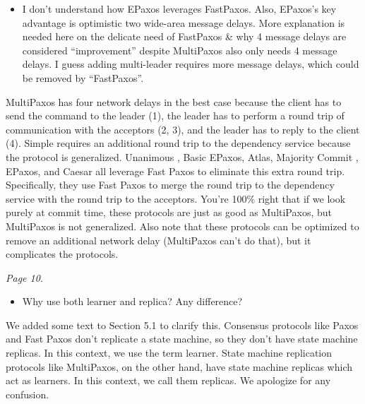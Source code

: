 \documentclass[letterpaper,twocolumn,10pt]{article}
\newenvironment{reviewerquote}
{\list{}{\leftmargin=\parindent\rightmargin=0in}\item[] \itshape \color{ReviewerDarkGray}}%
{\endlist}
\begin{document}
\begin{reviewerquote}
  \begin{itemize}
    \item
      I don't understand how EPaxos leverages FastPaxos. Also, EPaxos's key
      advantage is optimistic two wide-area message delays. More explanation is
      needed here on the delicate need of FastPaxos \& why 4 message delays are
      considered ``improvement'' despite MultiPaxos also only needs 4 message
      delays. I guess adding multi-leader requires more message delays, which
      could be removed by ``FastPaxos''.
  \end{itemize}
\end{reviewerquote}

MultiPaxos has four network delays in the best case because the client has to
send the command to the leader (1), the leader has to perform a round trip of
communication with the acceptors (2, 3), and the leader has to reply to the
client (4). Simple \BPaxos{} requires an additional round trip to the
dependency service because the protocol is generalized. Unanimous \BPaxos{},
Basic EPaxos, Atlas, Majority Commit \BPaxos{}, EPaxos, and Caesar all leverage
Fast Paxos to eliminate this extra round trip.  Specifically, they use Fast
Paxos to merge the round trip to the dependency service with the round trip to
the acceptors. You're 100\% right that if we look purely at commit time, these
protocols are just as good as MultiPaxos, but MultiPaxos is not generalized.
Also note that these protocols can be optimized to remove an additional network
delay (MultiPaxos can't do that), but it complicates the protocols.

\begin{reviewerquote}
  Page 10.

  \begin{itemize}
    \item
      Why use both learner and replica? Any difference?
  \end{itemize}
\end{reviewerquote}

We added some text to Section 5.1 to clarify this. Consensus protocols like
Paxos and Fast Paxos don't replicate a state machine, so they don't have state
machine replicas. In this context, we use the term learner. State machine
replication protocols like MultiPaxos, on the other hand, have state machine
replicas which act as learners. In this context, we call them replicas. We
apologize for any confusion.
\end{document}
